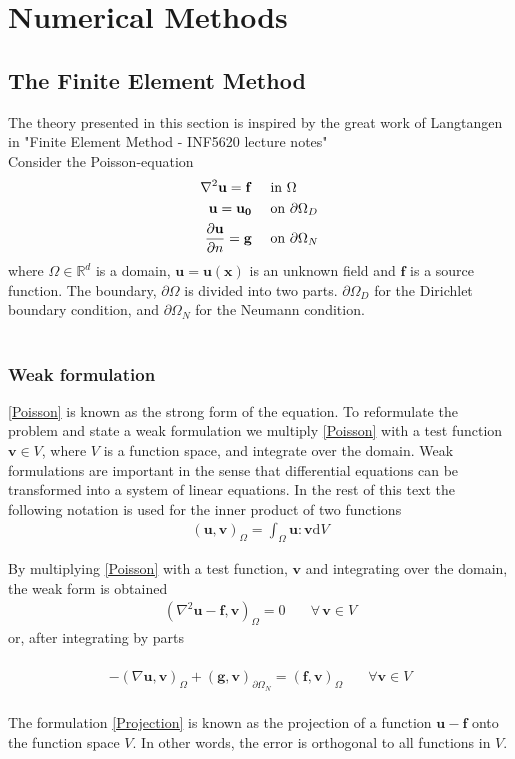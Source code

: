 \chapter{Numerical Methods}
\section{The Finite Element Method}
The theory presented in this section is inspired by the great work of Langtangen in "Finite Element Method - INF5620 lecture notes" \cite{Langtangen}  \\
Consider the Poisson-equation
\begin{align}
\nabla^2 \mathbf{u} = \mathbf{f} & \quad \text{ in } \Omega \label{Poisson}\\
\mathbf{u} = \mathbf{u_0} & \quad \text{ on } \partial \label{Poisson_D}\Omega_D \\
\frac{\partial \mathbf{u}}{\partial n} = \mathbf{g} & \quad \text{ on } \partial \Omega_N \label{Poisson_N}
\end{align}
where $\Omega \in \mathbb{R}^d$ is a domain, $ \mathbf{u} = \mathbf{u}(\mathbf{x})$ is an unknown field and $\mathbf{f}$ is a source function. The boundary, $\partial \Omega$ is divided into two parts. $\partial \Omega_D$ for the Dirichlet boundary condition, and $\partial \Omega_N$ for the Neumann condition. 
\\
\\
\subsection{Weak formulation}
\eqref{Poisson} is known as the strong form of the equation. To reformulate the problem and state a weak formulation we multiply \eqref{Poisson} with a test function $\mathbf{v} \in V$, where $V$ is a function space, and integrate over the domain. Weak formulations are important in the sense that differential equations can be transformed into a system of linear equations. In the rest of this text the following notation is used for the inner product of two functions
\begin{align} (\mathbf{u},\mathbf{v})_{\Omega} = \int_{\Omega} \mathbf{u} : \mathbf{v} \mathrm{d}V \end{align}

By multiplying \eqref{Poisson} with a test function, $\mathbf{v}$ and integrating over the domain, the weak form is obtained
\begin{align}
(\nabla^2 \mathbf{u} - \mathbf{f}, \mathbf{v})_\Omega = 0 & \quad \forall \, \mathbf{v} \in V \label{Projection}
\end{align}
or, after integrating by parts \\ \\
\begin{align}
-(\nabla \mathbf{u}, \mathbf{v})_\Omega + (\mathbf{g}, \mathbf{v})_{\partial \Omega_N} = (\mathbf{f},\mathbf{v})_\Omega & \quad \forall \mathbf{v} \in V \label{Weak_form}
\end{align}
\\
The formulation \eqref{Projection} is known as the projection of a function $\mathbf{u} - \mathbf{f}$ onto the function space $V$. In other words, the error is orthogonal to all functions in $V$. 

